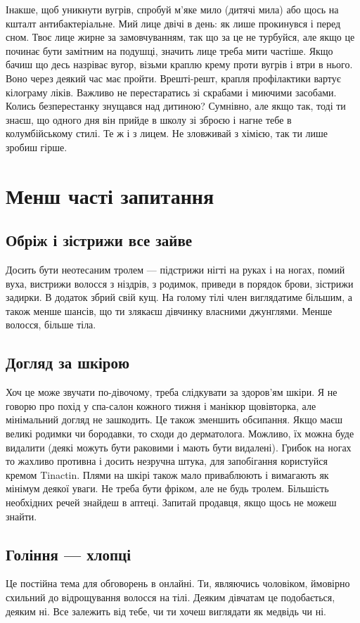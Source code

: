 Інакше, щоб уникнути вугрів, спробуй м’яке мило (дитячі мила) або щось
на кшталт антибактеріальне. Мий лице двічі в день: як лише прокинувся і перед
сном. Твоє лице жирне за замовчуванням, так що за це не турбуйся, але якщо це
починає бути замітним на подушці, значить лице треба мити частіше. Якщо бачиш
що десь назріває вугор, візьми краплю крему проти вугрів і втри в нього. Воно
через деякий час має пройти. Врешті-решт, крапля профілактики вартує кілограму
ліків. Важливо не перестаратись зі скрабами і миючими засобами. Колись
безперестанку знущався над дитиною? Сумнівно, але якщо так, тоді ти знаєш, що
одного дня він прийде в школу зі зброєю і нагне тебе в колумбійському стилі.
Те ж і з лицем. Не зловживай з хімією, так ти лише зробиш гірше.

\section{Менш часті запитання}
\subsection{Обріж і зістрижи все зайве}
Досить бути неотесаним тролем — підстрижи нігті на руках і на ногах, помий
вуха, вистрижи волосся з ніздрів, з родимок, приведи в порядок брови, зістрижи
задирки. В додаток збрий свій кущ. На голому тілі член виглядатиме більшим, а
також менше шансів, що ти злякаєш дівчинку власними джунглями. Менше волосся,
більше тіла.

\subsection{Догляд за шкірою}

Хоч це може звучати по-дівочому, треба слідкувати за здоров’ям шкіри. Я не
говорю про похід у спа-салон кожного тижня і манікюр щовівторка, але
мінімальний догляд не зашкодить. Це також зменшить обсипання. Якщо маєш великі
родимки чи бородавки, то сходи до дерматолога. Можливо, їх можна буде видалити
(деякі можуть бути раковими і мають бути видалені). Грибок на ногах то жахливо
противна і досить незручна штука, для запобігання користуйся кремом Tinactin.
Плями на шкірі також мало приваблюють і вимагають як мінімум деякої уваги. Не
треба бути фріком, але не будь тролем. Більшість необхідних речей знайдеш в
аптеці. Запитай продавця, якщо щось не можеш знайти.

\subsection{Гоління — хлопці}
Це постійна тема для обговорень в онлайні. Ти, являючись чоловіком, ймовірно
схильний до відрощування волосся на тілі. Деяким дівчатам це подобається,
деяким ні. Все залежить від тебе, чи ти хочеш виглядати як медвідь чи ні.

